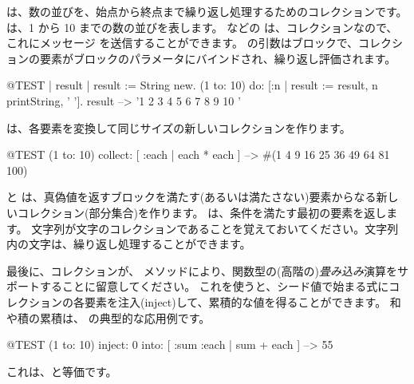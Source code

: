 \documentclass[a4paper,10pt,twoside]{book}
\begin{document}
 は、数の並びを、始点から終点まで繰り返し処理するためのコレクションです。
は、1 から 10 までの数の並びを表します。
 などの  は、コレクションなので、これにメッセージ  を送信することができます。
 の引数はブロックで、コレクションの要素がブロックのパラメータにバインドされ、繰り返し評価されます。

\begin{code}{@TEST | result |}
result := String new.
(1 to: 10) do: [:n | result := result, n printString, ' '].
result --> '1 2 3 4 5 6 7 8 9 10 '
\end{code}


 は、各要素を変換して同じサイズの新しいコレクションを作ります。
\begin{code}{@TEST}
(1 to: 10) collect: [ :each | each * each ] --> #(1 4 9 16 25 36 49 64 81 100)
\end{code}

 と  は、真偽値を返すブロックを満たす(あるいは満たさない)要素からなる新しいコレクション(部分集合)を作ります。
 は、条件を満たす最初の要素を返します。
文字列が文字のコレクションであることを覚えておいてください。文字列内の文字は、繰り返し処理することができます。


最後に、コレクションが、 メソッドにより、関数型の(高階の)\emph{畳み込み}演算をサポートすることに留意してください。
これを使うと、シード値で始まる式にコレクションの各要素を注入(inject)して、累積的な値を得ることができます。
和や積の累積は、 の典型的な応用例です。

\begin{code}{@TEST}
(1 to: 10) inject: 0 into: [ :sum :each | sum + each ] --> 55
\end{code}

\noindent
これは、と等価です。
\end{document}
